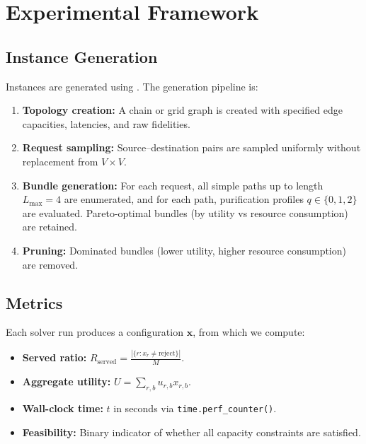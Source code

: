 \documentclass[10pt,a4paper]{article}
\begin{document}
\section{Experimental Framework}
\label{sec:framework}

\subsection{Instance Generation}
\label{sec:instances}

Instances are generated using
.  The generation pipeline is:

\begin{enumerate}
  \item \textbf{Topology creation:} A chain or grid graph is created
    with specified edge capacities, latencies, and raw fidelities.
  \item \textbf{Request sampling:} Source--destination pairs are
    sampled uniformly without replacement from $V \times V$.
  \item \textbf{Bundle generation:} For each request, all simple
    paths up to length $L_{\max} = 4$ are enumerated, and for each
    path, purification profiles $q \in \{0, 1, 2\}$ are evaluated.
    Pareto-optimal bundles (by utility vs resource consumption) are
    retained.
  \item \textbf{Pruning:} Dominated bundles (lower utility, higher
    resource consumption) are removed.
\end{enumerate}

\subsection{Metrics}
\label{sec:metrics}

Each solver run produces a configuration $\mathbf{x}$, from which we
compute:

\begin{itemize}
  \item \textbf{Served ratio:}
    $\displaystyle R_{\text{served}} = \frac{|\{r : x_r \neq
    \text{reject}\}|}{M}$.
  \item \textbf{Aggregate utility:}
    $\displaystyle U = \sum_{r,b} u_{r,b} x_{r,b}$.
  \item \textbf{Wall-clock time:} $t$ in seconds via
    \texttt{time.perf\_counter()}.
  \item \textbf{Feasibility:} Binary indicator of whether all
    capacity constraints are satisfied.
\end{itemize}
\end{document}

